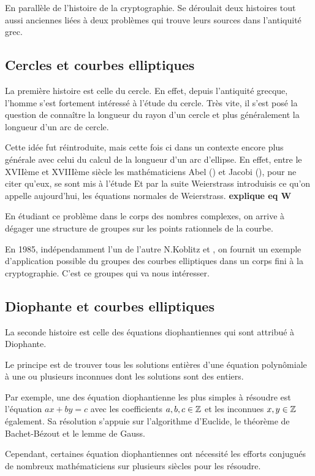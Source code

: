 En parallèle de l'histoire de la cryptographie. Se déroulait deux histoires tout aussi
anciennes liées à deux problèmes qui trouve leurs sources dans l'antiquité grec.

\subsection{Cercles et courbes elliptiques}
La première histoire est celle du cercle. En effet, depuis l'antiquité grecque, l'homme
s'est fortement intéressé à l'étude du cercle. Très vite, il s'est posé la question de
connaître la longueur du rayon d'un cercle et plus généralement la longueur d'un arc
de cercle. 

Cette idée fut réintroduite, mais cette fois ci dans un contexte encore plus générale
avec celui du calcul de la longueur d'un arc d'ellipse. En
effet, entre le XVIIème et XVIIIème siècle les mathématiciens Abel () et Jacobi
(), pour ne citer qu'eux, se sont mis à l'étude 
Et par la suite Weierstrass introduisis ce qu'on appelle aujourd'hui, les équations
normales de Weierstrass. 
\textbf{explique eq W}

En étudiant ce problème dans le corps des nombres complexes, on arrive à dégager une
structure de groupes sur les points rationnels de la courbe.

En 1985, indépendamment l'un de l'autre N.Koblitz et , on fournit un exemple d'application
possible du groupes des courbes elliptiques dans un corps fini à la cryptographie. C'est ce
groupes qui va nous intéresser.

\subsection{Diophante et courbes elliptiques}

La seconde histoire est celle des équations diophantiennes qui sont attribué à Diophante.

Le principe est de trouver tous les solutions entières d'une équation polynômiale à une ou
plusieurs inconnues dont les solutions sont des entiers.

Par exemple, une des équation diophantienne les plus simples à résoudre est l'équation $ax+by = c$ avec
les coefficients $a,b,c \in \mathbb{Z}$ et les inconnues $x,y \in \mathbb{Z}$ également. Sa résolution s'appuie
sur l'algorithme d'Euclide, le théorème de Bachet-Bézout et le lemme de Gauss.

Cependant, certaines équation diophantiennes ont nécessité les efforts conjugués de nombreux
mathématiciens sur plusieurs siècles pour les résoudre.

